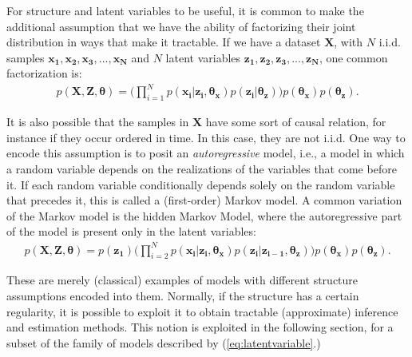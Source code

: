 For structure and latent variables to be useful, it is common to make the additional
assumption that we have the ability of factorizing their joint distribution in ways that
make it tractable. If we have a dataset $\bm{X}$, with $N$ i.i.d. samples $\bm{x_1}, \bm{x_2}, \bm{x_3}, ..., \bm{x_N}$
and $N$ latent variables $\bm{z_1}, \bm{z_2}, \bm{z_3}, ..., \bm{z_N}$, one common factorization is:
\begin{align}
    p(\bm{X}, \bm{Z}, \bm{\theta}) = \Big(\prod^N_{i=1} p(\bm{x_i}| \bm{z_i}, \bm{\theta_x})
                                                        p(\bm{z_i} | \bm{\theta_z})\Big) 
                                                        p(\bm{\theta_x})
                                                        p(\bm{\theta_z}). \label{eq:latentvariable}
\end{align}

It is also possible that the samples in $\bm{X}$ have some sort of causal
relation, for instance if they occur ordered in time. In this case, they are not i.i.d.
One way to encode this assumption is to posit an \emph{autoregressive} model, i.e.,
a model in which a random variable depends on the realizations of the variables
that come before it. If each random variable conditionally depends solely on the
random variable that precedes it, this is called a (first-order) Markov model.
A common variation of the Markov model is the hidden Markov Model, where the
autoregressive part of the model is present only in the latent variables:
\begin{align}
    p(\bm{X}, \bm{Z}, \bm{\theta}) = p(\bm{z_1}) \Big(\prod^N_{i=2} p(\bm{x_i} | \bm{z_i}, \bm{\theta_x})
                                     p(\bm{z_i}| \bm{z_{i-1}}, \bm{\theta_z}) \Big)
                                     p(\bm{\theta_x}) p(\bm{\theta_z}).
\end{align}

These are merely (classical) examples of models with different structure assumptions encoded
into them. Normally, if the structure has a certain regularity, it is possible
to exploit it to obtain tractable (approximate) inference and estimation methods.
This notion is exploited in the following section, for a subset of the family
of models described by (\ref{eq:latentvariable}.)

